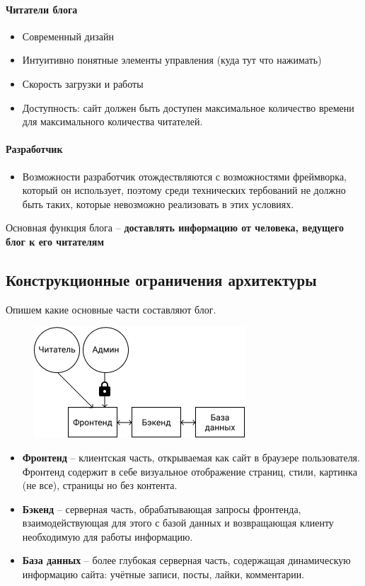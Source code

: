 \documentclass[bibliography=totocnumbered]{scrartcl}
\begin{document}
\paragraph{Читатели блога}
\begin{itemize}
    \item Современный дизайн
    \item Интуитивно понятные элементы управления (куда тут что нажимать)
    \item Скорость загрузки и работы
    \item Доступность: сайт должен быть доступен максимальное количество времени для максимального количества читателей.
\end{itemize}

\paragraph{Разработчик}
\begin{itemize}
    \item Возможности разработчик отождествляются с возможностями фреймворка, который он использует, поэтому среди технических тербований не должно быть таких, которые невозможно реализовать в этих условиях.
\end{itemize}

Основная функция блога -- \textbf{доставлять информацию от человека, ведущего блог к его читателям}

\subsection{Конструкционные ограничения архитектуры}
Опишем какие основные части составляют блог.
\begin{figure}[htp]
    \centering
    \includegraphics[scale=1.00]{client_server.png}
\end{figure}

\begin{itemize}
    \item \textbf{Фронтенд} -- клиентская часть, открываемая как сайт в браузере пользователя. Фронтенд содержит в себе визуальное отображение страниц, стили, картинка (не все), страницы но без контента.
    \item \textbf{Бэкенд} -- серверная часть, обрабатывающая запросы фронтенда, взаимодействующая для этого с базой данных и  возвращающая клиенту необходимую для работы информацию.
    \item \textbf{База данных} -- более глубокая серверная часть, содержащая динамическую информацию сайта: учётные записи, посты, лайки, комментарии.  
\end{itemize}
\end{document}
